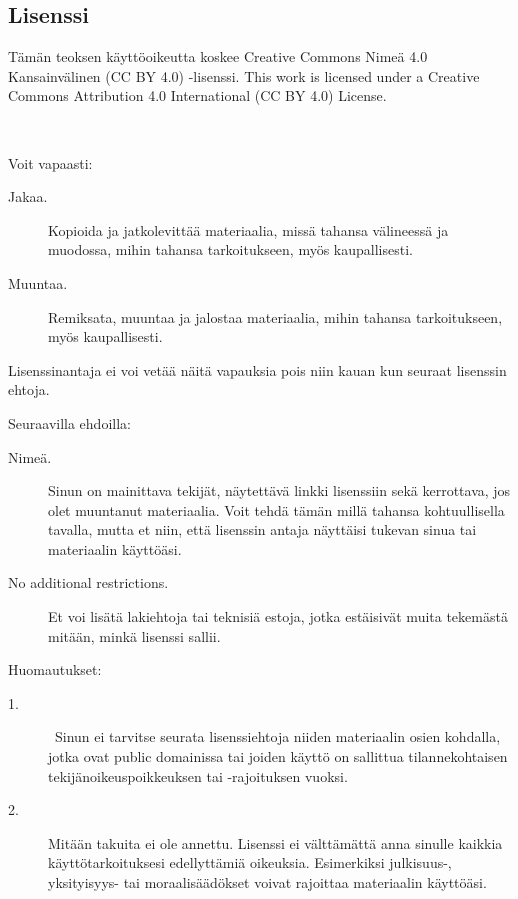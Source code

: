 \subsection*{Lisenssi}

Tämän teoksen käyttöoikeutta koskee Creative Commons Nimeä 4.0 Kansainvälinen (CC BY 4.0) -lisenssi.
This work is licensed under a Creative Commons Attribution 4.0 International (CC BY 4.0) License.

 \\

Voit vapaasti:
\begin{description}
\item[Jakaa.] Kopioida ja jatkolevittää materiaalia, missä tahansa välineessä ja muodossa, mihin tahansa tarkoitukseen, myös kaupallisesti.
\item[Muuntaa.] Remiksata, muuntaa ja jalostaa materiaalia, mihin tahansa tarkoitukseen, myös kaupallisesti.
\end{description}

Lisenssinantaja ei voi vetää näitä vapauksia pois niin kauan kun seuraat lisenssin ehtoja.

Seuraavilla ehdoilla:
\begin{description}
\item[Nimeä.] Sinun on mainittava tekijät, näytettävä linkki lisenssiin sekä kerrottava, jos olet muuntanut materiaalia. Voit tehdä tämän millä tahansa kohtuullisella tavalla, mutta et niin, että lisenssin antaja näyttäisi tukevan sinua tai materiaalin käyttöäsi.
\item[No additional restrictions.] Et voi lisätä lakiehtoja tai teknisiä estoja, jotka estäisivät muita tekemästä mitään, minkä lisenssi sallii.
\end{description}

Huomautukset:
\begin{description}
\item[1.] Sinun ei tarvitse seurata lisenssiehtoja niiden materiaalin osien kohdalla, jotka ovat public domainissa tai joiden käyttö on sallittua tilannekohtaisen tekijänoikeuspoikkeuksen tai -rajoituksen vuoksi.
\item[2.] Mitään takuita ei ole annettu. Lisenssi ei välttämättä anna sinulle kaikkia käyttötarkoituksesi edellyttämiä oikeuksia. Esimerkiksi julkisuus-, yksityisyys- tai moraalisäädökset voivat rajoittaa materiaalin käyttöäsi.
\end{description}
